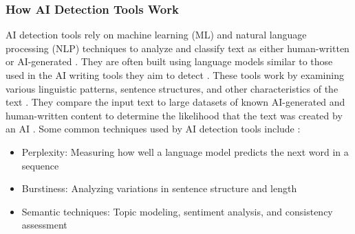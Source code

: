 \documentclass{article}
\begin{document}
\subsubsection{How AI Detection Tools Work}
AI detection tools rely on machine learning (ML) and natural language processing (NLP) techniques to analyze and classify text as either human-written or AI-generated \cite{https://surferseo.com/blog/how-do-ai-content-detectors-work/} \cite{https://contadu.com/ai-detection-tools-the-challenge-of-todays-digital-age/}. They are often built using language models similar to those used in the AI writing tools they aim to detect \cite{https://www.scribbr.com/ai-tools/how-do-ai-detectors-work/}. These tools work by examining various linguistic patterns, sentence structures, and other characteristics of the text \cite{https://surferseo.com/blog/how-do-ai-content-detectors-work/} \cite{https://contadu.com/ai-detection-tools-the-challenge-of-todays-digital-age/}. They compare the input text to large datasets of known AI-generated and human-written content to determine the likelihood that the text was created by an AI \cite{https://www.scribbr.com/ai-tools/how-do-ai-detectors-work/} \cite{https://contadu.com/ai-detection-tools-the-challenge-of-todays-digital-age/}. Some common techniques used by AI detection tools include \cite{https://surferseo.com/blog/how-do-ai-content-detectors-work/} \cite{https://contadu.com/ai-detection-tools-the-challenge-of-todays-digital-age/}:
\begin{itemize}
    \item Perplexity: Measuring how well a language model predicts the next word in a sequence
    \item Burstiness: Analyzing variations in sentence structure and length
    \item Semantic techniques: Topic modeling, sentiment analysis, and consistency assessment
\end{itemize}
\end{document}
